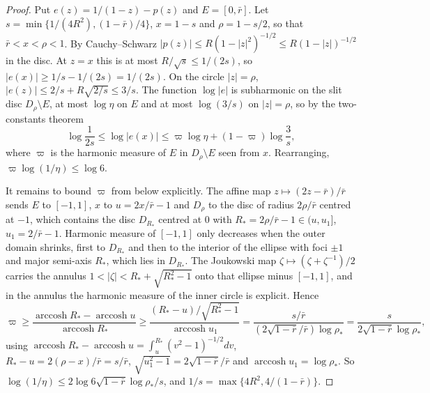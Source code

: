 \begin{proof}
Put $e(z)=1/(1-z)-p(z)$ and $E=[0,\bar r]$. Let $s=\min\{1/(4R^2),(1-\bar r)/4\}$, $x=1-s$ and $\rho=1-s/2$, so that $\bar r<x<\rho<1$. By Cauchy--Schwarz $|p(z)|\le R(1-|z|^2)^{-1/2}\le R(1-|z|)^{-1/2}$ in the disc. At $z=x$ this is at most $R/\sqrt s\le1/(2s)$, so $|e(x)|\ge1/s-1/(2s)=1/(2s)$. On the circle $|z|=\rho$, $|e(z)|\le2/s+R\sqrt{2/s}\le3/s$. The function $\log|e|$ is subharmonic on the slit disc $D_\rho\setminus E$, at most $\log\eta$ on $E$ and at most $\log(3/s)$ on $|z|=\rho$, so by the two-constants theorem \citep[Theorem~4.3.7]{t:ransford1995}
\[
\log\frac1{2s}\le\log|e(x)|\le\varpi\log\eta+(1-\varpi)\log\frac3s,
\]
where $\varpi$ is the harmonic measure of $E$ in $D_\rho\setminus E$ seen from $x$. Rearranging, $\varpi\log(1/\eta)\le\log6$.

It remains to bound $\varpi$ from below explicitly. The affine map $z\mapsto(2z-\bar r)/\bar r$ sends $E$ to $[-1,1]$, $x$ to $u=2x/\bar r-1$ and $D_\rho$ to the disc of radius $2\rho/\bar r$ centred at $-1$, which contains the disc $D_{R_*}$ centred at $0$ with $R_*=2\rho/\bar r-1\in(u,u_1]$, $u_1=2/\bar r-1$. Harmonic measure of $[-1,1]$ only decreases when the outer domain shrinks, first to $D_{R_*}$ and then to the interior of the ellipse with foci $\pm1$ and major semi-axis $R_*$, which lies in $D_{R_*}$. The Joukowski map $\zeta\mapsto(\zeta+\zeta^{-1})/2$ carries the annulus $1<|\zeta|<R_*+\sqrt{R_*^2-1}$ onto that ellipse minus $[-1,1]$, and in the annulus the harmonic measure of the inner circle is explicit. Hence
\[
\varpi\ge\frac{\operatorname{arccosh}R_*-\operatorname{arccosh}u}{\operatorname{arccosh}R_*}\ge\frac{(R_*-u)/\sqrt{R_*^2-1}}{\operatorname{arccosh}u_1}=\frac{s/\bar r}{(2\sqrt{1-\bar r}/\bar r)\log\rho_*}=\frac{s}{2\sqrt{1-\bar r}\log\rho_*},
\]
using $\operatorname{arccosh}R_*-\operatorname{arccosh}u=\int_u^{R_*}(v^2-1)^{-1/2}dv$, $R_*-u=2(\rho-x)/\bar r=s/\bar r$, $\sqrt{u_1^2-1}=2\sqrt{1-\bar r}/\bar r$ and $\operatorname{arccosh}u_1=\log\rho_*$. So $\log(1/\eta)\le2\log6\sqrt{1-\bar r}\log\rho_*/s$, and $1/s=\max\{4R^2,4/(1-\bar r)\}$.
\end{proof}

